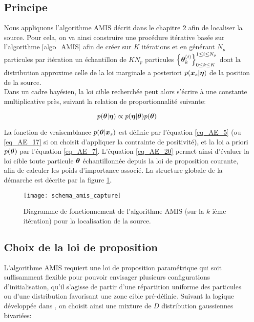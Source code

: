 \subsection{Principe}

Nous appliquons l'algorithme AMIS décrit dans le chapitre 2 afin de localiser la source. Pour cela, on va ainsi construire une procédure itérative basée sur l'algorithme \ref{algo_AMIS} afin de créer sur $K$ itérations et en générant $N_p$ particules par itération un échantillon de $KN_p$ particules $\left\{{\bm{\theta}}_k^{(i)}\right\}_{0\leq k \leq K}^{1\leq i \leq N_p}$ dont la distribution approxime celle de la loi marginale a posteriori $p({\bm{x}_s} | {\bm{\eta}})$ de la position de la source.\\

Dans un cadre bayésien, la loi cible recherchée peut alors s'écrire à une constante multiplicative près, suivant la relation de proportionnalité suivante:

\begin{equation}
p({\bm{\theta}} | {\bm{\eta}}) \propto p({\bm{\eta}} | {\bm{\theta}})p({\bm{\theta}})
\label{eq_AE_20}
\end{equation}

La fonction de vraisemblance $p({\bm{\theta}} | {\bm{x}_s})$ est définie par l'équation \eqref{eq_AE_5} (ou \eqref{eq_AE_17} si on choisit d'appliquer la contrainte de positivité), et la loi a priori $p({\bm{\theta}})$ par l'équation \eqref{eq_AE_7}. L'équation \eqref{eq_AE_20} permet ainsi d'évaluer la loi cible toute particule ${\bm{\theta}}$ échantillonnée depuis la loi de proposition courante, afin de calculer les poids d'importance associé. La structure globale de la démarche est décrite par la figure \ref{schema_amis}.\\

\begin{figure}[h!]
	\centering
	\texttt{[image: schema\_amis\_capture]}
	\caption{Diagramme de fonctionnement de l'algorithme AMIS (sur la $k$-ième itération) pour la localisation de la source.}
	\label{schema_amis}
\end{figure}

\subsection{Choix de la loi de proposition}

L'algorithme AMIS requiert une loi de proposition paramétrique qui soit suffisamment flexible pour pouvoir envisager plusieurs configurations d'initialisation, qu'il s'agisse de partir d'une répartition uniforme des particules ou d'une distribution favorisant une zone cible pré-définie. Suivant la logique développée dans \cite{Cappe2008}, on choisit ainsi une mixture de $D$ distribution gaussiennes bivariées:

